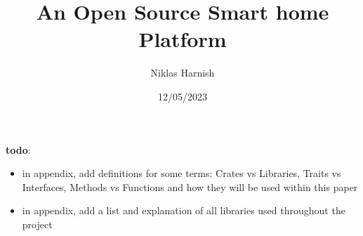 \documentclass{LULCSProject}
\title{An Open Source Smart home Platform}
\author{Niklas Harnish}
\date{12/05/2023}
\begin{document}
\maketitle


\newpage
\listoffigures
\newpage
\listoftables

\newpage
\textbf{todo}:
\begin{itemize}
    \item in appendix, add definitions for some terms: Crates vs Libraries, Traits vs Interfaces, Methods vs Functions and how they will be used within this paper
    \item in appendix, add a list and explanation of all libraries used throughout the project
\end{itemize}

\pagebreak
{}



\newpage


\newpage


\newpage


\newpage


\newpage


\newpage


\newpage
\appendix

\newpage

\newpage 

\end{document}
